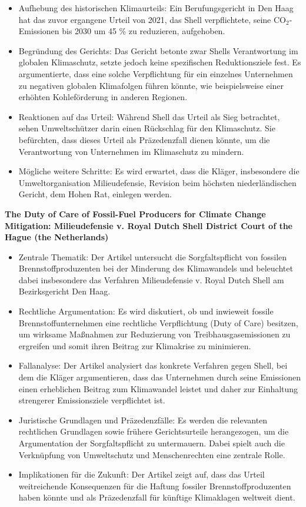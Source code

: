 \documentclass[a4paper, 12pt]{article} %
\begin{document}
\begin{itemize}
   \item Aufhebung des historischen Klimaurteils: Ein Berufungsgericht in Den Haag hat das zuvor ergangene Urteil von 2021, das Shell verpflichtete, seine CO$_2$-Emissionen bis 2030 um 45 \% zu reduzieren, aufgehoben.
   \item Begründung des Gerichts: Das Gericht betonte zwar Shells Verantwortung im globalen Klimaschutz, setzte jedoch keine spezifischen Reduktionsziele fest. Es argumentierte, dass eine solche Verpflichtung für ein einzelnes Unternehmen zu negativen globalen Klimafolgen führen könnte, wie beispielsweise einer erhöhten Kohleförderung in anderen Regionen. 
   \item Reaktionen auf das Urteil: Während Shell das Urteil als Sieg betrachtet, sehen Umweltschützer darin einen Rückschlag für den Klimaschutz. Sie befürchten, dass dieses Urteil als Präzedenzfall dienen könnte, um die Verantwortung von Unternehmen im Klimaschutz zu mindern.
   \item Mögliche weitere Schritte: Es wird erwartet, dass die Kläger, insbesondere die Umweltorganisation Milieudefensie, Revision beim höchsten niederländischen Gericht, dem Hohen Rat, einlegen werden.
\end{itemize}

\textbf{\cite{Mayer_2022} The Duty of Care of Fossil-Fuel Producers for Climate Change Mitigation: {{Milieudefensie}} v. Royal Dutch Shell District Court of the Hague (the Netherlands)}

\begin{itemize}
   \item Zentrale Thematik: Der Artikel untersucht die Sorgfaltspflicht von fossilen Brennstoffproduzenten bei der Minderung des Klimawandels und beleuchtet dabei insbesondere das Verfahren Milieudefensie v. Royal Dutch Shell am Bezirksgericht Den Haag.
   \item Rechtliche Argumentation: Es wird diskutiert, ob und inwieweit fossile Brennstoffunternehmen eine rechtliche Verpflichtung (Duty of Care) besitzen, um wirksame Maßnahmen zur Reduzierung von Treibhausgasemissionen zu ergreifen und somit ihren Beitrag zur Klimakrise zu minimieren.
   \item Fallanalyse: Der Artikel analysiert das konkrete Verfahren gegen Shell, bei dem die Kläger argumentieren, dass das Unternehmen durch seine Emissionen einen erheblichen Beitrag zum Klimawandel leistet und daher zur Einhaltung strengerer Emissionsziele verpflichtet ist.
   \item Juristische Grundlagen und Präzedenzfälle: Es werden die relevanten rechtlichen Grundlagen sowie frühere Gerichtsurteile herangezogen, um die Argumentation der Sorgfaltspflicht zu untermauern. Dabei spielt auch die Verknüpfung von Umweltschutz und Menschenrechten eine zentrale Rolle.
   \item Implikationen für die Zukunft: Der Artikel zeigt auf, dass das Urteil weitreichende Konsequenzen für die Haftung fossiler Brennstoffproduzenten haben könnte und als Präzedenzfall für künftige Klimaklagen weltweit dient.
\end{itemize}
\end{document}
